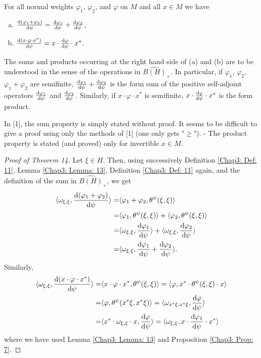\begin{theorem}
    For all normal weights $\varphi_1$, $\varphi_2$, and $\varphi$ on $M$ and all $x\in M$ we have
    \begin{enumerate}[(a)]
        \item $\dv{(\varphi_1+\varphi_2)}{\psi}=\dv{\varphi_1}{\psi}+\dv{\varphi_2}{\psi}$,
        \item $\dv{(x\cdot\varphi\cdot x^*)}{\psi}=x\cdot\dv{\varphi}{\psi}\cdot x^*$.
    \end{enumerate}
\end{theorem}
\begin{remark}
    The sums and products occurring at the right hand side of (a) and (b) are to be understood in the sense of the operations in $\widehat{B(H)}_+$. In particular, if $\varphi_1$, $\varphi_2$, $\varphi_1+\varphi_2$ are semifinite, $\dv{\varphi_1}{\psi}+\dv{\varphi_2}{\psi}$ is the form sum of the positive self-adjoint operators $\dv{\varphi_1}{\psi}$ and $\dv{\varphi_2}{\psi}$. Similarly, if $x\cdot\varphi\cdot x^*$ is semifinite, $x\cdot\dv{\varphi}{\psi}\cdot x^*$ is the form product.
\end{remark}
\begin{remark}
    In [1], the sum property is simply stated without proof. It seems to be difficult to give a proof using only the methods of [1] (one only gets "$\geq$"). - The product property is stated (and proved) only for invertible $x\in M$.
\end{remark}
\begin{proof}[Proof of Theorem 14]
    Let $\xi\in H$. Then, using successively Definition \ref{Chap3: Def: 11}, Lemma \ref{Chap3: Lemma: 13}, Definition \ref{Chap3: Def: 11} again, and the definition of the sum in $\widehat{B(H)}_+$, we get
    \[
        \begin{split}
            \langle\omega_{\xi,\xi},\dv{(\varphi_1+\varphi_2)}{\psi}\rangle=&\langle\varphi_1+\varphi_2,\theta^\psi(\xi,\xi)\rangle\\
            =&\langle\varphi_1,\theta^\psi(\xi,\xi)\rangle+\langle\varphi_2,\theta^\psi(\xi,\xi)\rangle\\
            =&\langle\omega_{\xi,\xi},\dv{\varphi_1}{\psi}\rangle+\langle\omega_{\xi,\xi},\dv{\varphi_2}{\psi}\rangle\\
            =&\langle\omega_{\xi,\xi},\dv{\varphi_1}{\psi}+\dv{\varphi_2}{\psi}\rangle.
        \end{split}
    \]
    Similarly,
    \[
        \begin{split}
            \langle\omega_{\xi,\xi},\dv{(x\cdot\varphi\cdot x^*)}{\psi}\rangle=&\langle x\cdot\varphi\cdot x^*,\theta^\psi(\xi,\xi)\rangle=\langle\varphi,x^*\cdot\theta^\psi(\xi,\xi)\cdot x\rangle\\
            =&\langle\varphi,\theta^\psi(x^*\xi,x^*\xi)\rangle=\langle\omega_{x^*\xi,x^*\xi},\dv{\varphi}{\psi}\rangle\\
            =&\langle x^*\cdot\omega_{\xi,\xi}\cdot x,\dv{\varphi}{\psi}\rangle=\langle\omega_{\xi,\xi},x\cdot\dv{\varphi_1}{\psi}\cdot x^*\rangle
        \end{split}
    \]
    where we have used Lemma \ref{Chap3: Lemma: 13} and Proposition \ref{Chap3: Prop: 7}.
\end{proof}

